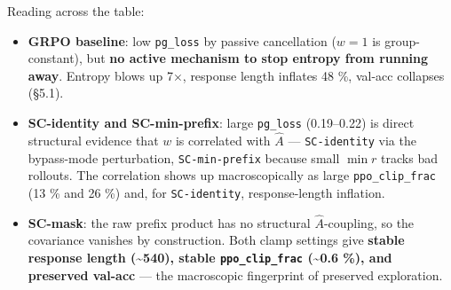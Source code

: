 \documentclass[11pt,a4paper]{article}
\theoremstyle{remark}
\begin{document}
\begin{table}[H]\centering\scriptsize
\setlength{\tabcolsep}{4pt}
\end{table}

Reading across the table:

\begin{itemize}[leftmargin=1.2em]
\item \textbf{GRPO baseline}: low \texttt{pg\_loss} by passive cancellation ($w=1$ is group-constant), but \textbf{no active mechanism to stop entropy from running away}. Entropy blows up 7$\times$, response length inflates 48 \%, val-acc collapses (§5.1).
\item \textbf{SC-identity and SC-min-prefix}: large \texttt{pg\_loss} (0.19--0.22) is direct structural evidence that $w$ is correlated with $\hat A$ --- \texttt{SC-identity} via the bypass-mode perturbation, \texttt{SC-min-prefix} because small $\min r$ tracks bad rollouts. The correlation shows up macroscopically as large \texttt{ppo\_clip\_frac} (13 \% and 26 \%) and, for \texttt{SC-identity}, response-length inflation.
\item \textbf{SC-mask}: the raw prefix product has no structural $\hat A$-coupling, so the covariance vanishes by construction. Both clamp settings give \textbf{stable response length (\textasciitilde{}540), stable \texttt{ppo\_clip\_frac} (\textasciitilde{}0.6 \%), and preserved val-acc} --- the macroscopic fingerprint of preserved exploration.
\end{itemize}
\end{document}
